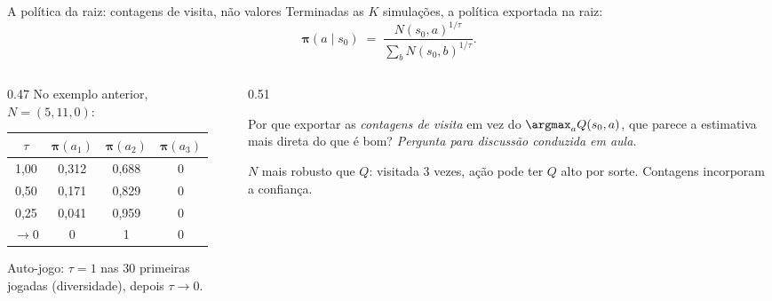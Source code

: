 \documentclass[aspectratio=169, 10pt]{beamer}
\newcommand{\paradiscussao}{\smallskip
  {\footnotesize\color{rlCinza}\itshape Pergunta para discussão conduzida em aula.}}
\newcommand{\Nvis}{N}
\newcommand{\raizpol}{\bm{\pi}}
\begin{document}
\begin{frame}{A política da raiz: contagens de visita, não valores}
  \footnotesize
  Terminadas as $K$ simulações, a política exportada na raiz:
  \[
    \raizpol(a \mid s_0) \;=\; \frac{\Nvis(s_0,a)^{1/\tau}}{\sum_b \Nvis(s_0,b)^{1/\tau}} .
  \]

  \begin{columns}[T]
    \begin{column}{0.47\textwidth}
      No exemplo anterior, $\Nvis = (5,11,0)$:
      \medskip
      \begin{center}\small
      \begin{tabular}{cccc}
        \toprule
        $\tau$ & $\raizpol(a_1)$ & $\raizpol(a_2)$ & $\raizpol(a_3)$ \\
        \midrule
        1,00 & 0,312 & 0,688 & 0 \\
        0,50 & 0,171 & 0,829 & 0 \\
        0,25 & 0,041 & 0,959 & 0 \\
        $\to 0$ & 0 & 1 & 0 \\
        \bottomrule
      \end{tabular}
      \end{center}
      \medskip
      Auto-jogo: $\tau = 1$ nas 30 primeiras jogadas (diversidade), depois $\tau \to 0$.
    \end{column}
    \begin{column}{0.51\textwidth}
      \begin{quizbox}{}
        Por que exportar as \emph{contagens de visita} em vez do
        $\argmax_a Q(s_0,a)$, que parece a estimativa mais direta do que é bom?
        \paradiscussao
      \end{quizbox}
      \pause
      \begin{respbox}
        $\Nvis$ mais robusto que $Q$: visitada 3 vezes, ação pode ter $Q$ alto por sorte. Contagens incorporam a confiança.
      \end{respbox}
    \end{column}
  \end{columns}
\end{frame}
\end{document}
